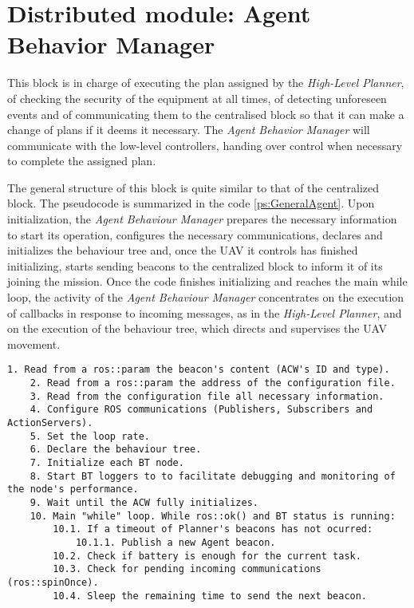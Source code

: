 \section{Distributed module: Agent Behavior Manager}
\label{sec:Distributed module: behavior manager}
This block is in charge of executing the plan assigned by the \emph{High-Level Planner}, of checking the security of the equipment at all times, of detecting unforeseen events and of communicating them to the centralised block so that it can make a change of plans if it deems it necessary. The \emph{Agent Behavior Manager} will communicate with the low-level controllers, handing over control when necessary to complete the assigned plan.

The general structure of this block is quite similar to that of the centralized block. The pseudocode is summarized in the code \ref{ps:GeneralAgent}. Upon initialization, the \emph{Agent Behaviour Manager} prepares the necessary information to start its operation, configures the necessary communications, declares and initializes the behaviour tree and, once the \gls{UAV} it controls has finished initializing, starts sending beacons to the centralized block to inform it of its joining the mission. Once the code finishes initializing and reaches the main while loop, the activity of the \emph{Agent Behaviour Manager} concentrates on the execution of callbacks in response to incoming messages, as in the \emph{High-Level Planner}, and on the execution of the behaviour tree, which directs and supervises the \gls{UAV} movement.

\begin{lstlisting}[caption={General operation of \emph{Agent Behaviour Manager}'s code}, breaklines=true, label=ps:GeneralAgent]
	1. Read from a ros::param the beacon's content (ACW's ID and type).
	2. Read from a ros::param the address of the configuration file.
	3. Read from the configuration file all necessary information.
	4. Configure ROS communications (Publishers, Subscribers and ActionServers).
	5. Set the loop rate.
	6. Declare the behaviour tree.
	7. Initialize each BT node.
	8. Start BT loggers to to facilitate debugging and monitoring of the node's performance.
	9. Wait until the ACW fully initializes.
	10. Main "while" loop. While ros::ok() and BT status is running:
		10.1. If a timeout of Planner's beacons has not ocurred:
			10.1.1. Publish a new Agent beacon.
		10.2. Check if battery is enough for the current task.
		10.3. Check for pending incoming communications (ros::spinOnce).
		10.4. Sleep the remaining time to send the next beacon.
\end{lstlisting}

